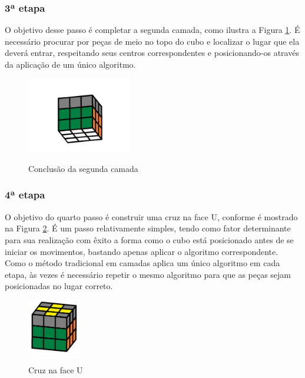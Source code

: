 \subsubsection{3ª etapa}

O objetivo desse passo é completar a segunda camada, como ilustra a Figura \ref{fig:figpassoo3}. É necessário procurar por peças de meio no topo do cubo e localizar o lugar que ela deverá entrar, respeitando seus centros correspondentes e posicionando-os através da aplicação de um único algoritmo.

\begin{figure}[!htb]
    \centering
    {
        \includegraphics[height=3.3cm]{imagens/passo3.jpg}
        \label{figFront}
    }
    
\caption{Conclusão da segunda camada}
\label{fig:figpassoo3}
\end{figure}

\subsubsection{4ª etapa}

O objetivo do quarto passo é construir uma cruz na face U, conforme é mostrado na Figura \ref{fig:figpasso4}. É um passo relativamente simples, tendo como fator determinante para sua realização com êxito a forma como o cubo está posicionado antes de se iniciar os movimentos, bastando apenas aplicar o algoritmo correspondente. Como o método tradicional em camadas aplica um único algoritmo em cada etapa, às vezes é necessário repetir o mesmo algoritmo para que as peças sejam posicionadas no lugar correto. 


\begin{figure}[!htb]
    \centering
    {
        \includegraphics[height=2.4cm]{imagens/passo4.jpg}
        \label{figFront}
    }
    
\caption{Cruz na face U}
\label{fig:figpasso4}
\end{figure}

